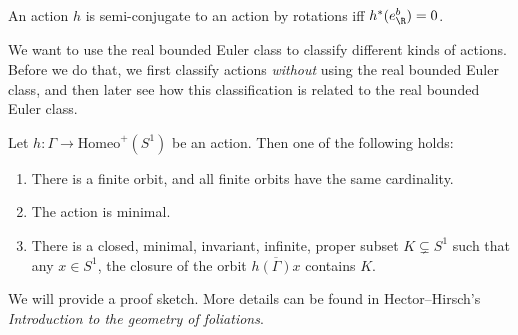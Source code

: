 \documentclass[a4paper]{article}
\newcommand\Homeo{\mathrm{Homeo}}
\newcommand\Rot{\mathrm{Rot}}
\begin{document}
\begin{cor}
  An action $h$ is semi-conjugate to an action by rotations iff $h^*(e_\R^b) = 0$.
\end{cor}
%
%

We want to use the real bounded Euler class to classify different kinds of actions. Before we do that, we first classify actions \emph{without} using the real bounded Euler class, and then later see how this classification is related to the real bounded Euler class.

\begin{thm}
  Let $h\colon \Gamma \to \Homeo^+(S^1)$ be an action. Then one of the following holds:
  \begin{enumerate}
    \item There is a finite orbit, and all finite orbits have the same cardinality.
    \item The action is minimal.
    \item There is a closed, minimal, invariant, infinite, proper subset $K \subsetneq S^1$ such that any $x \in S^1$, the closure of the orbit $\overline{h(\Gamma) x}$ contains $K$.
  \end{enumerate}
\end{thm}
We will provide a proof sketch. More details can be found in Hector--Hirsch's \emph{Introduction to the geometry of foliations}.
\end{document}
